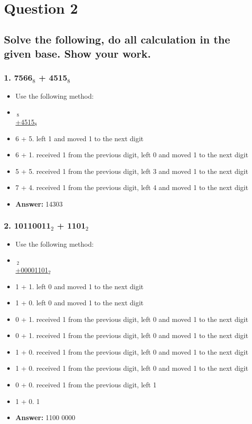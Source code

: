 \documentclass[11pt, oneside]{article}
\begin{document}
\pagebreak

\section*{Question 2}

\subsection*{Solve the following, do all calculation in the given base. Show your work.}

\subsubsection*{1. 7566$_{8}$ + 4515$_{8}$}

\begin{itemize}
    \item Use the following method:
    \item \,\;$_{8}$ \\\underline{+4515$_{8}$}
    \item 6 + 5. left 1 and moved 1 to the next digit
    \item 6 + 1. received 1 from the previous digit, left 0 and moved 1 to the next digit
    \item 5 + 5. received 1 from the previous digit, left 3 and moved 1 to the next digit
    \item 7 + 4. received 1 from the previous digit, left 4 and moved 1 to the next digit
    \item \textbf{Answer:} 14303
\end{itemize}

\subsubsection*{2. 10110011$_{2}$ + 1101$_{2}$}

\begin{itemize}
    \item Use the following method:
    \item \,\;$_{2}$ \\\underline{+00001101$_{2}$}
    \item 1 + 1. left 0 and moved 1 to the next digit
    \item 1 + 0. left 0 and moved 1 to the next digit
    \item 0 + 1. received 1 from the previous digit, left 0 and moved 1 to the next digit
    \item 0 + 1. received 1 from the previous digit, left 0 and moved 1 to the next digit
    \item 1 + 0. received 1 from the previous digit, left 0 and moved 1 to the next digit
    \item 1 + 0. received 1 from the previous digit, left 0 and moved 1 to the next digit
    \item 0 + 0. received 1 from the previous digit, left 1
    \item 1 + 0. 1
    \item \textbf{Answer:} 1100 0000
\end{itemize}
\end{document}
